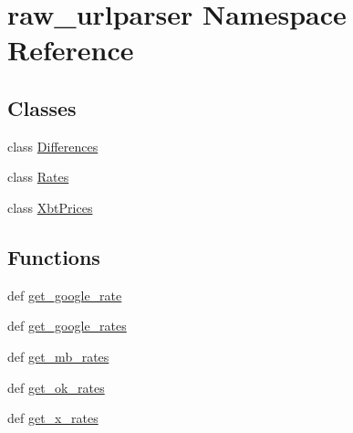 \hypertarget{namespaceraw__urlparser}{\section{raw\-\_\-urlparser Namespace Reference}
\label{namespaceraw__urlparser}
}
\subsection*{Classes}
\begin{DoxyCompactItemize}
\item 
class \hyperlink{classraw__urlparser_1_1_differences}{Differences}
\item 
class \hyperlink{classraw__urlparser_1_1_rates}{Rates}
\item 
class \hyperlink{classraw__urlparser_1_1_xbt_prices}{Xbt\-Prices}
\end{DoxyCompactItemize}
\subsection*{Functions}
\begin{DoxyCompactItemize}
\item 
def \hyperlink{namespaceraw__urlparser_a27ce239a7915c6468e00168213575365}{get\-\_\-google\-\_\-rate}
\item 
def \hyperlink{namespaceraw__urlparser_a503f638b00ab579b8b829e1dbb95e547}{get\-\_\-google\-\_\-rates}
\item 
def \hyperlink{namespaceraw__urlparser_a56532368ca9848b5f2ab298e3e6232bb}{get\-\_\-mb\-\_\-rates}
\item 
def \hyperlink{namespaceraw__urlparser_a3a9d9300bd89d803ca1fddb78145f58e}{get\-\_\-ok\-\_\-rates}
\item 
def \hyperlink{namespaceraw__urlparser_a264ca664879b007ee92399e30ec0d9bc}{get\-\_\-x\-\_\-rates}
\end{DoxyCompactItemize}

